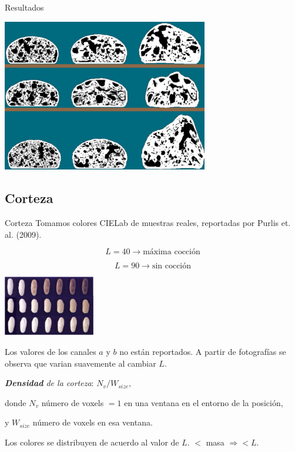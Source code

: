 \documentclass[spanish,unknownkeysallowed]{beamer}
\begin{document}
\begin{frame}{Resultados}

\centerline{\includegraphics[width=9cm]{../figures/Fig9}}

\end{frame}

\subsection{Corteza}

\begin{frame}{Corteza}
Tomamos colores CIELab de muestras reales, reportadas por Purlis et. al. (2009).

$$L = 40 \rightarrow \text{máxima cocción}$$

$$L = 90 \rightarrow \text{sin cocción}$$

\centerline{\includegraphics[width=4cm]{../figures/browning}}

\end{frame}

\begin{frame}

Los valores de los canales $a$ y $b$ no están reportados. A partir de fotografías se observa que varian suavemente al cambiar $L$.

\vspace{0.2cm}

{\em \textbf{Densidad} de la corteza}: $N_{v} / W_{size},$

donde $N_{v}$ número de voxels $= 1$ en una ventana en el entorno de la posición,

y $W_{size}$ número de voxels en esa ventana.

\vspace{0.2cm}
Los colores se distribuyen de acuerdo al valor de $L$. $<$ masa $\Rightarrow < L$.

\end{frame}
\end{document}

